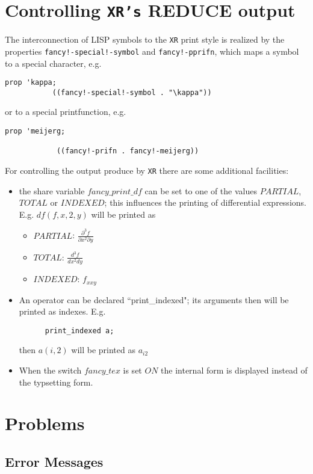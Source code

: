 \section{Controlling {\tt XR's} REDUCE output}

The interconnection of LISP symbols to the {\tt XR} print style 
is realized by the properties {\tt fancy!-special!-symbol} and
{\tt fancy!-pprifn}, which maps a symbol to a special character, e.g.
\begin{verbatim}
prop 'kappa;
           ((fancy!-special!-symbol . "\kappa")) 
\end{verbatim}
or to a special printfunction, e.g.
\begin{verbatim}
prop 'meijerg;

            ((fancy!-prifn . fancy!-meijerg)) 
\end{verbatim}

For controlling the output produce by  {\tt XR} there are some additional
facilities:
\begin{itemize}
\item  the share variable $fancy\_print\_df$ can be set to one of
  the values $PARTIAL$, $TOTAL$ or $INDEXED$; this influences the
  printing of differential expressions. E.g. $df(f,x,2,y)$ will be
  printed as
  \begin{itemize}
  \item{$PARTIAL$}: $\frac{\partial ^3 f}{\partial x^2 \partial y}$
  \item{$TOTAL$}: $\frac{d ^3 f}{d x^2 d y}$
  \item{$INDEXED$}: $f_{xxy}$
  \end{itemize}
\item An operator can be declared ``print\_indexed"; its arguments
   then will be printed as indexes. E.g.
   \begin{verbatim}
      print_indexed a;
   \end{verbatim}
   then $a(i,2)$ will be printed as $a_{i 2}$
\item When the switch $fancy\_tex$ is set $ON$ the internal form
   is displayed instead of the typsetting form.
\end{itemize}

\newpage
\section{Problems}

\subsection{Error Messages}

